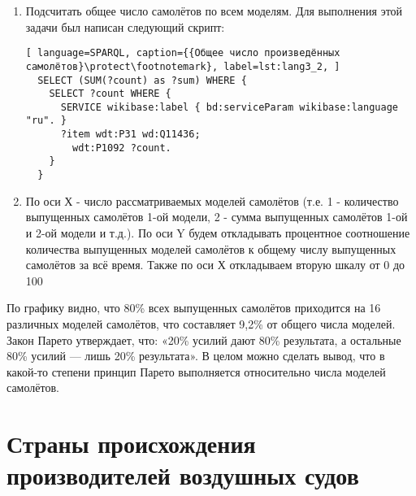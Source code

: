 \begin{enumerate} 
  \item Подсчитать общее число самолётов по всем моделям. Для выполнения этой задачи был написан следующий скрипт:
  
  \begin{lstlisting}[ language=SPARQL, caption={{Общее число произведённых самолётов}\protect\footnotemark}, label=lst:lang3_2, ]
  SELECT (SUM(?count) as ?sum) WHERE {
    SELECT ?count WHERE {
      SERVICE wikibase:label { bd:serviceParam wikibase:language "ru". }
      ?item wdt:P31 wd:Q11436;
        wdt:P1092 ?count.
    }
  }
  \end{lstlisting}
  
  
  \item По оси Х - число рассматриваемых моделей самолётов (т.е. 1 - количество выпущенных самолётов 1-ой модели, 2 - сумма выпущенных самолётов 1-ой и 2-ой модели и т.д.). По оси Y будем откладывать процентное соотношение количества выпущенных моделей самолётов к общему числу выпущенных самолётов за всё время. Также по оси Х откладываем вторую шкалу от 0 до 100%
\end{enumerate}

\begin{figure*}[h]

    \setlength{\fboxsep}{0pt}%
    \setlength{\fboxrule}{1pt}%

	\caption{Распределение числа выпущенных моделей самолётов, 2020.}%
    \label{fig:Pareto_principle_diargam}%
\end{figure*}

По графику видно, что 80\% всех выпущенных самолётов приходится на 16 различных моделей самолётов, что составляет 9,2\% от общего числа моделей. Закон Парето утверждает, что: «20\% усилий дают 80\% результата, а остальные 80\% усилий — лишь 20\% результата». В целом можно сделать вывод, что в какой-то степени принцип Парето выполняется относительно числа моделей самолётов.


\section{Страны происхождения производителей воздушных судов}

